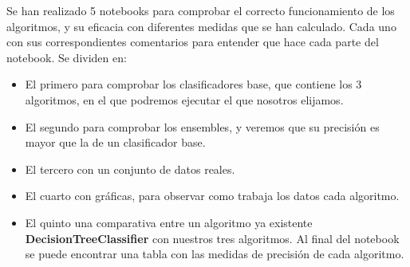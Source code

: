 Se han realizado 5 notebooks para comprobar el correcto funcionamiento de los algoritmos, y su eficacia con diferentes medidas que se han calculado. Cada uno con sus correspondientes comentarios para entender que hace cada parte del notebook. Se dividen en:
\begin{itemize}
	\item El primero para comprobar los clasificadores base, que contiene los 3 algoritmos, en el que podremos ejecutar el que nosotros elijamos.
	\item El segundo para comprobar los ensembles, y veremos que su precisión es mayor que la de un clasificador base.
	\item El tercero con un conjunto de datos reales.
	\item El cuarto con gráficas, para observar como trabaja los datos cada algoritmo.
	\item El quinto una comparativa entre un algoritmo ya existente \textbf{DecisionTreeClassifier} con nuestros tres algoritmos. Al final del notebook se puede encontrar una tabla con las medidas de precisión de cada algoritmo.
\end{itemize}
